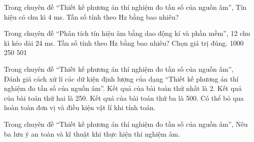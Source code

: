 \begin{ex}
Trong chuyên đề “Thiết kế phương án thí nghiệm đo tần số của nguồn âm”, Tín hiệu có chu kì 4 ms. Tần số tính theo Hz bằng bao nhiêu?
\end{ex}

\begin{ex}
Trong chuyên đề “Phân tích tín hiệu âm bằng dao động kí và phần mềm”, 12 chu kì kéo dài 24 ms. Tần số tính theo Hz bằng bao nhiêu? Chọn giá trị đúng.
\choice
{1000}
{250}
{501}
{}
\end{ex}

\begin{ex}
Trong chuyên đề “Thiết kế phương án thí nghiệm đo tần số của nguồn âm”, Đánh giá cách xử lí các dữ kiện định lượng của dạng “Thiết kế phương án thí nghiệm đo tần số của nguồn âm”.
\choiceTF
{\True Kết quả của bài toán thứ nhất là 2.}
{\True Kết quả của bài toán thứ hai là 250.}
{\True Kết quả của bài toán thứ ba là 500.}
{Có thể bỏ qua hoàn toàn đơn vị và điều kiện vật lí khi tính toán.}
\end{ex}

\begin{ex}
Trong chuyên đề “Thiết kế phương án thí nghiệm đo tần số của nguồn âm”, Nêu ba lưu ý an toàn và kĩ thuật khi thực hiện thí nghiệm âm.
\choiceTF

\end{ex}

